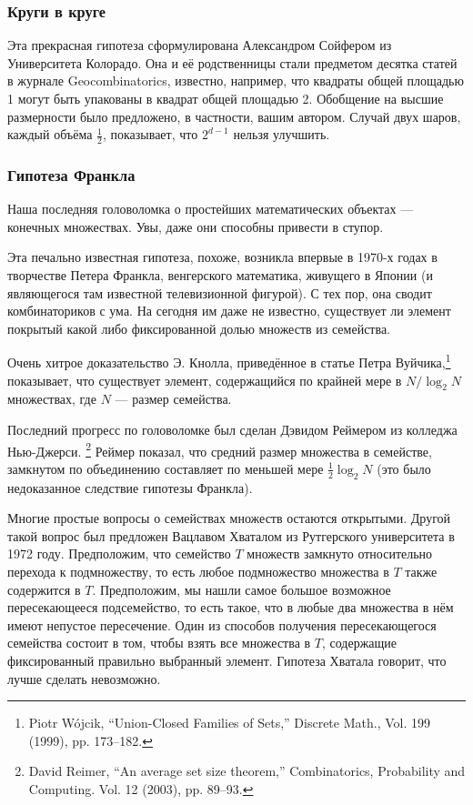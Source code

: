 \subsubsection*{Круги в круге}

Эта прекрасная гипотеза сформулирована Александром Сойфером из Университета Колорадо.
Она и её родственницы стали предметом десятка статей в журнале Geocombinatorics, известно, например, что квадраты общей площадью 1 могут быть упакованы в квадрат общей площадью 2.
Обобщение на высшие размерности было предложено, в частности, вашим автором.
Случай двух шаров, каждый объёма $\tfrac12$, показывает, что $2^{d-1}$ нельзя улучшить.

\subsubsection*{Гипотеза Франкла}

Наша последняя головоломка о простейших математических объектах --- конечных множествах.
Увы, даже они способны привести в ступор.

Эта печально известная гипотеза, похоже, возникла впервые в 1970-х годах в творчестве Петера Франкла, венгерского математика, живущего в Японии (и являющегося там известной телевизионной фигурой).
С тех пор, она сводит комбинаториков с ума. 
На сегодня им даже не известно, существует ли элемент покрытый какой либо фиксированной долью множеств из семейства.

Очень хитрое доказательство Э. Кнолла, приведённое в статье Петра Вуйчика,\footnote{Piotr W\'{o}jcik, ``Union-Closed Families of Sets,'' Discrete Math., Vol. 199 (1999), pp. 173--182.} показывает, что существует элемент, содержащийся по крайней мере в $N/\log_2 N$ множествах, где $N$ --- размер семейства.

Последний прогресс по головоломке был сделан Дэвидом Реймером из колледжа Нью-Джерси.%
\footnote{David Reimer, ``An average set size theorem,'' Combinatorics, Probability and Computing. Vol. 12 (2003), pp. 89--93.}
Реймер показал, что средний размер множества в семействе, замкнутом по объединению составляет по меньшей мере $\tfrac12\log_2N$ (это было недоказанное следствие гипотезы Франкла).

Многие простые вопросы о семействах множеств остаются открытыми.
Другой такой вопрос был предложен Вацлавом Хваталом из Рутгерского университета в 1972 году.
Предположим, что семейство $T$ множеств замкнуто относительно перехода к подмножеству, то есть любое подмножество множества в $T$ также содержится в $T$.
Предположим, мы нашли самое большое возможное пересекающееся подсемейство, то есть такое, что в любые два множества в нём имеют непустое пересечение.
Один из способов получения пересекающегося семейства состоит в том, чтобы взять все множества в $T$, содержащие фиксированный правильно выбранный элемент.
Гипотеза Хватала говорит, что лучше сделать невозможно.
